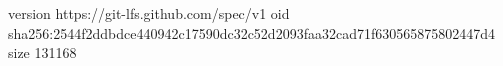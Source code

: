 version https://git-lfs.github.com/spec/v1
oid sha256:2544f2ddbdce440942c17590dc32c52d2093faa32cad71f630565875802447d4
size 131168
